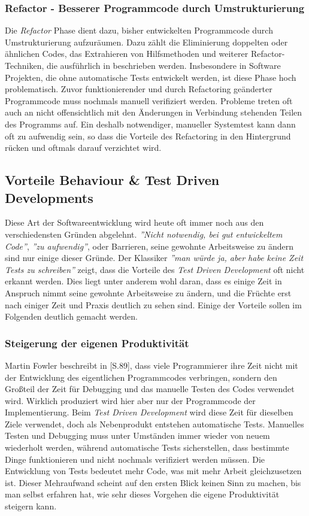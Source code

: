 \subsubsection{Refactor - Besserer Programmcode durch
  Umstrukturierung}
Die \textit{Refactor} Phase dient dazu, bisher entwickelten
Programmcode durch Umstrukturierung aufzuräumen. Dazu zählt die
Eliminierung doppelten oder ähnlichen Codes, das Extrahieren von
Hilfsmethoden und weiterer Refactor-Techniken, die ausführlich in
\cite{Fowler1999} beschrieben werden. Insbesondere in Software
Projekten, die ohne automatische Tests entwickelt werden, ist diese
Phase hoch problematisch. Zuvor funktionierender und durch Refactoring
geänderter Programmcode muss nochmals manuell verifiziert
werden. Probleme treten oft auch an nicht offensichtlich mit den
Änderungen in Verbindung stehenden Teilen des Programms auf. Ein
deshalb notwendiger, manueller Systemtest kann dann oft zu aufwendig
sein, so dass die Vorteile des Refactoring in den Hintergrund rücken
und oftmals darauf verzichtet wird.

\subsection{Vorteile Behaviour \& Test Driven Developments}
Diese Art der Softwareentwicklung wird heute oft immer noch aus den
verschiedensten Gründen abgelehnt. \textit{''Nicht notwendig, bei gut
  entwickeltem Code''}, \textit{''zu aufwendig''}, oder Barrieren,
seine gewohnte Arbeitsweise zu ändern sind nur einige dieser
Gründe. Der Klassiker \textit{''man würde ja, aber habe keine Zeit
  Tests zu schreiben''} zeigt, dass die Vorteile des \textit{Test
  Driven Development} oft nicht erkannt werden. Dies liegt unter
anderem wohl daran, dass es einige Zeit in Anspruch nimmt seine
gewohnte Arbeitsweise zu ändern, und die Früchte erst nach einiger
Zeit und Praxis deutlich zu sehen sind. Einige der Vorteile sollen im
Folgenden deutlich gemacht werden.

\subsubsection{Steigerung der eigenen Produktivität}
Martin Fowler beschreibt in \cite{Fowler1999}[S.89], dass viele
Programmierer ihre Zeit nicht mit der Entwicklung des eigentlichen
Programmcodes verbringen, sondern den Großteil der Zeit für Debugging
und das manuelle Testen des Codes verwendet wird. Wirklich produziert
wird hier aber nur der Programmcode der Implementierung. Beim
\textit{Test Driven Development} wird diese Zeit für dieselben Ziele
verwendet, doch als Nebenprodukt entstehen automatische
Tests. Manuelles Testen und Debugging muss unter Umständen immer
wieder von neuem wiederholt werden, während automatische Tests
sicherstellen, dass bestimmte Dinge funktionieren und nicht nochmals
verifiziert werden müssen. Die Entwicklung von Tests bedeutet mehr
Code, was mit mehr Arbeit gleichzusetzen ist. Dieser Mehraufwand
scheint auf den ersten Blick keinen Sinn zu machen, bis man selbst
erfahren hat, wie sehr dieses Vorgehen die eigene Produktivität
steigern kann.

